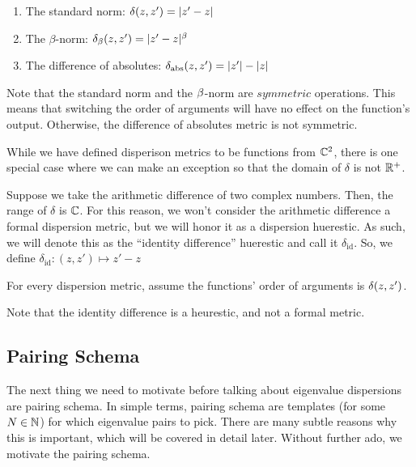 \begin{enumerate}
\item The standard norm: $\delta(z,z') = |z' - z|$
\item The $\beta$-norm: $\delta_\beta(z,z') = |z' - z|^\beta$
\item The difference of absolutes: $\delta_{\text{abs}}(z,z') = |z'| - |z|$
\end{enumerate}

\begin{remark}
Note that the standard norm and the $\beta$-norm are $\textit{symmetric}$ operations. This means that switching the order of arguments will have no effect on the function's output. Otherwise, the difference of absolutes metric is not symmetric.
\end{remark}

While we have defined disperison metrics to be functions from $\mathbb{C}^2$, there is one special case where we can make an exception so that the domain of $\delta$ is not $\mathbb{R}^+$.

\begin{remark}
Suppose we take the arithmetic difference of two complex numbers. Then, the range of $\delta$ is $\mathbb{C}$. For this reason, we won't consider the arithmetic difference a formal dispersion metric, but we will honor it as a dispersion huerestic. As such, we will denote this as the ``identity difference'' huerestic and call it $\delta_{\text{id}}$. So, we define $\delta_{\text{id}}: (z, z') \mapsto z' - z$
\end{remark}

For every dispersion metric, assume the functions' order of arguments is $\delta(z, z')$. \newline
\begin{center}
\dispersiontable %
\end{center}
\vspace{1em}

\noindent *Note that the identity difference is a heurestic, and not a formal metric.

\subsection{Pairing Schema}

The next thing we need to motivate before talking about eigenvalue dispersions are pairing schema. In simple terms, pairing schema are templates (for some $N \in \mathbb{N}$) for which eigenvalue pairs to pick. There are many subtle reasons why this is important, which will be covered in detail later. Without further ado, we motivate the pairing schema.

